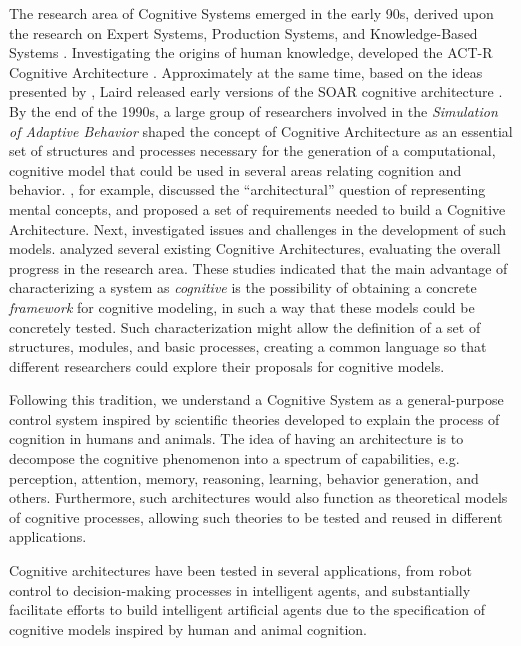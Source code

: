 The research area of Cognitive Systems emerged in the early 90s, derived upon the research on Expert Systems, Production Systems, and Knowledge-Based Systems \citep{newell1961gps, simon1971human}. Investigating the origins of human knowledge, \cite{anderson1989theory} developed the ACT-R Cognitive Architecture \citep{anderson2004integrated,anderson2009can}. Approximately at the same time, based on the ideas presented by \cite{newell1989symbolic}, Laird released early versions of the SOAR cognitive architecture \citep{laird1996evolution,laird2012soar}. By the end of the 1990s, a large group of researchers involved in the \emph{Simulation of Adaptive Behavior} shaped the concept of Cognitive Architecture as an essential set of structures and processes necessary for the generation of a computational, cognitive model that could be used in several areas relating cognition and behavior. \cite{sloman2002architecture}, for example, discussed the ``architectural'' question of representing mental concepts, and \citet{sun2004desiderata} proposed a set of requirements needed to build a Cognitive Architecture. Next, \cite{sun2007importance} investigated issues and challenges in the development of such models. \cite{langley2009cognitive} analyzed several existing Cognitive Architectures, evaluating the overall progress in the research area. These studies indicated that the main advantage of characterizing a system as \emph{cognitive} is the possibility of obtaining a concrete \emph{framework} for cognitive modeling, in such a way that these models could be concretely tested. Such characterization might allow the definition of a set of structures, modules, and basic processes, creating a common language so that different researchers could explore their proposals for cognitive models.

Following this tradition, we understand a Cognitive System as a general-purpose control system inspired by scientific theories developed to explain the process of cognition in humans and animals. The idea of having an architecture is to decompose the cognitive phenomenon into a spectrum of capabilities, e.g. perception, attention, memory, reasoning, learning, behavior generation, and others. Furthermore, such architectures would also function as theoretical models of cognitive processes, allowing such theories to be tested and reused in different applications.

Cognitive architectures have been tested in several applications, from robot control to decision-making processes in intelligent agents, and substantially facilitate efforts to build intelligent artificial agents due to the specification of cognitive models inspired by human and animal cognition. 


